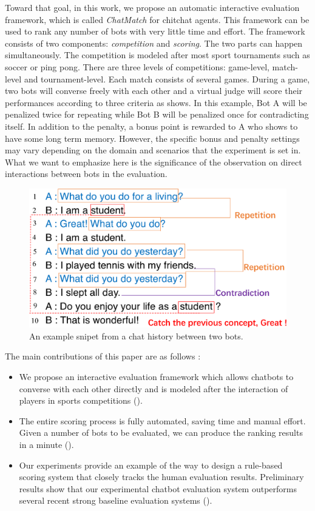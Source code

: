 Toward that goal, in this work, we propose an automatic interactive evaluation framework, which is called \textit{ChatMatch} for chitchat
agents. This framework can be used to rank any number of bots with very little
time and effort. The framework consists of two components: \textit{competition} and 
\textit{scoring}. The two parts can happen simultaneously. The competition is modeled
after most sport tournaments such as soccer or ping pong. 
There are three levels of competitions: 
game-level, match-level and tournament-level. 
Each match consists of several games. During a game, two bots will converse 
freely with each other and a virtual judge will score their performances according to
three criteria as  shows. In this example, Bot A will be 
penalized twice for repeating while Bot B will be penalized once for 
contradicting itself. In addition to the penalty, 
a bonus point is rewarded to A
who shows to have some long term memory. 
However, the specific bonus and penalty settings may vary 
depending on the domain and scenarios that the experiment is 
set in. What we want to emphasize here is the significance of 
the observation on direct interactions between bots in the evaluation.

\begin{figure}[th!]
	\centering
	\includegraphics[width=0.95\columnwidth]{example.eps}
	\caption{An example snipet from a chat history between two bots.}
	\label{fig:example}
\end{figure}

The main contributions of this paper are as follows :
\begin{itemize}
\item We propose an interactive evaluation framework which allows chatbots 
to converse with each other directly and is modeled after 
the interaction of players in sports competitions ().
\item  The entire scoring process is fully automated, saving 
time and manual effort. Given a number of bots to be evaluated, 
we can produce the ranking results in a minute ().
\item  Our experiments provide an example of the way to 
design a rule-based scoring system that closely tracks the 
human evaluation results. Preliminary results show
that our experimental chatbot evaluation system outperforms 
several recent strong baseline evaluation systems ().
\end{itemize}
